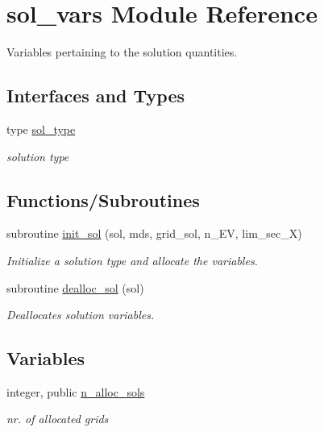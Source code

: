 \hypertarget{namespacesol__vars}{}\section{sol\+\_\+vars Module Reference}
\label{namespacesol__vars}


Variables pertaining to the solution quantities.  


\subsection*{Interfaces and Types}
\begin{DoxyCompactItemize}
\item 
type \hyperlink{structsol__vars_1_1sol__type}{sol\+\_\+type}
\begin{DoxyCompactList}\small\item\em solution type \end{DoxyCompactList}\end{DoxyCompactItemize}
\subsection*{Functions/\+Subroutines}
\begin{DoxyCompactItemize}
\item 
subroutine \hyperlink{namespacesol__vars_a05d1378774a44f53c9643bdacc5bee4a}{init\+\_\+sol} (sol, mds, grid\+\_\+sol, n\+\_\+\+EV, lim\+\_\+sec\+\_\+X)
\begin{DoxyCompactList}\small\item\em Initialize a solution type and allocate the variables. \end{DoxyCompactList}\item 
subroutine \hyperlink{namespacesol__vars_a9ae65a5252aede548e5238e50c1bb2ba}{dealloc\+\_\+sol} (sol)
\begin{DoxyCompactList}\small\item\em Deallocates solution variables. \end{DoxyCompactList}\end{DoxyCompactItemize}
\subsection*{Variables}
\begin{DoxyCompactItemize}
\item 
integer, public \hyperlink{namespacesol__vars_a91634d69ba45b896816f40e9013ddc79}{n\+\_\+alloc\+\_\+sols}
\begin{DoxyCompactList}\small\item\em nr. of allocated grids \end{DoxyCompactList}\end{DoxyCompactItemize}


